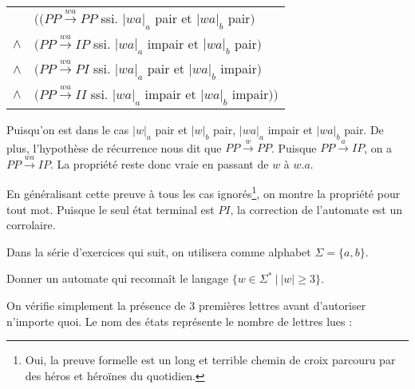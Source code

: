 \begin{correction*}
\begin{tabular}{rl}
& $((PP \xrightarrow{wa} PP$ ssi. $|wa|_a $ pair et $|wa|_b$ pair$)$ \\

$\wedge$& $(PP \xrightarrow{wa} IP$ ssi. $|wa|_a $ impair et $|wa|_b$ pair$)$ \\

$\wedge$& $(PP \xrightarrow{wa} PI$ ssi. $|wa|_a $ pair et $|wa|_b$ impair$)$ \\

$\wedge$& $(PP \xrightarrow{wa} II$ ssi. $|wa|_a $ impair et $|wa|_b$ impair$))$ 
\end{tabular}

Puisqu'on est dans le cas $|w|_a$ pair et $|w|_b$ pair, $|wa|_a$ impair et $|wa|_b$ pair. De plus, l'hypothèse de récurrence nous dit que $PP \xrightarrow{w} PP$. Puisque $PP \xrightarrow{a} IP$, on a $PP \xrightarrow{wa} IP$. La propriété reste donc vraie en passant de $w$ à $w.a$.

En généralisant cette preuve à tous les cas ignorés\footnote{Oui, la preuve formelle est un long et terrible chemin de croix parcouru par des héros et héroïnes du quotidien.}, on montre la propriété pour tout mot. Puisque le seul état terminal est $PI$, la correction de l'automate est un corrolaire.
\end{correction*}

Dans la série d'exercices qui suit, on utilisera comme alphabet $\Sigma = \{a,b\}$.

\begin{exercice}
Donner un automate qui reconnaît le langage $\{w \in \Sigma^*~|~|w| \geq 3\}$. 
\end{exercice}

\begin{correction*}

On vérifie simplement la présence de 3 premières lettres avant d'autoriser n'importe quoi. Le nom des états représente le nombre de lettres lues : 

\centering
{}

\end{correction*}

